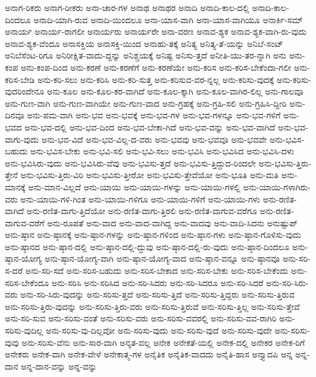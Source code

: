 {ಅನಾಗ-ರಿಕರು
ಅನಾಗ-ರೀಕರು
ಅನಾ-ಚಾರ-ಗಳ
ಅನಾಥ
ಅನಾಥರ
ಅನಾದಿ
ಅನಾದಿ-ಕಾಲ-ದಲ್ಲಿ
ಅನಾದಿ-ಕಾಲ-ದಿಂದಲೂ
ಅನಾದಿ-ಯಾಗಿ-ರುವ
ಅನಾದಿ-ಯಿಂದಲೂ
ಅನಾ-ಯಾಸ-ವಾಗಿ
ಅನಾ-ಯಾಸ-ವಾಗಿಯೂ
ಅನಾರ್ಕಿ-ಸಮ್
ಅನಾರ್ಯ
ಅನಾರ್ಯ-ರಾಗಲೀ
ಅನಾರ್ಯರು
ಅನಾರ್ಯರೇ
ಅನಾ-ವರಣ
ಅನಾವ-ಶ್ಯಕ
ಅನಾವ-ಶ್ಯಕ-ವಾಗಿ-ರು-ವುದು
ಅನಾವ-ಶ್ಯಕ-ವೆಂದೂ
ಅನಾಸಕ್ತಿಯ
ಅನಾಸಕ್ತಿ-ಯಿಂದ
ಅನಾಹು-ತಕ್ಕೆ
ಅನಿತ್ಯ
ಅನಿತ್ಯ-ತೆ-ಯನ್ನು
ಅನಿಬೆ-ಸಂಟ್
ಅನಿಬೆಸೆಂಟ-ರಿಗೂ
ಅನಿರೀಕ್ಷಿತ-ವಾದು-ದ್ದನ್ನು
ಅನಿಶ್ಚಯಕ್ಕೆ
ಅನಿಷ್ಟ
ಅನಿಸು-ತ್ತದೆ
ಅನೀತಿ-ಯು-ತರ-ನ್ನಾಗಿ
ಅನು
ಅನು-ಕಂಪ
ಅನು-ಕಂಪ-ದಿಂದ
ಅನು-ಕರಣೆ
ಅನು-ಕರಣೆಗೆ
ಅನು-ಕರಣೆಯೇ
ಅನು-ಕರಿಸ
ಅನು-ಕರಿಸ-ಬೇಕೆಂದಾ-ಗಲೀ
ಅನು-ಕರಿಸ-ಬೇಡಿ
ಅನು-ಕರಿ-ಸಲು
ಅನು-ಕರಿಸಿ
ಅನು-ಕರಿ-ಸುತ್ತ
ಅನು-ಕರಿಸುವ-ವರ-ನ್ನಲ್ಲ
ಅನು-ಕರಿಸು-ವುದಕ್ಕೆ
ಅನು-ಕರಿಸು-ವುದರಿಂದೇನೂ
ಅನು-ಕೂಲ
ಅನು-ಕೂಲ-ಕರ-ವಾಗಿದೆ
ಅನು-ಕೂಲ-ಕ್ಕಾಗಿ
ಅನು-ಕೂಲ-ವಾಗಿರ-ಲಿಲ್ಲ
ಅನು-ಗಾಲವೂ
ಅನು-ಗುಣ-ವಾಗಿ
ಅನು-ಗುಣ-ವಾಗಿಯೇ
ಅನು-ಗುಣ-ವಾದ
ಅನು-ಗ್ರಹಕ್ಕೆ
ಅನು-ಗ್ರಹಿ-ಸಲಿ
ಅನು-ಗ್ರಹಿಸಿ-ದ್ದೀರಿ
ಅನು-ದಿನವೂ
ಅನು-ಪಮ-ವಾಗಿ
ಅನು-ಭವ
ಅನು-ಭವಕ್ಕೆ
ಅನು-ಭವ-ಗಳ
ಅನು-ಭವ-ಗಳನ್ನೂ
ಅನು-ಭವ-ಗಳಿಗೆ
ಅನು-ಭವದ
ಅನು-ಭವ-ದಲ್ಲಿ
ಅನು-ಭವ-ದಿಂದ
ಅನು-ಭವ-ಬೇಕಾ-ಗಿದೆ
ಅನು-ಭವ-ವನ್ನು
ಅನು-ಭವ-ವಾಗಿದೆ
ಅನು-ಭವ-ವಾಗು-ವುದು
ಅನು-ಭವ-ವಿದೆ
ಅನು-ಭವ-ವಿಲ್ಲ-ದ-ವರು
ಅನು-ಭವವು
ಅನು-ಭವವೂ
ಅನು-ಭವವೇ
ಅನು-ಭವಿಸ-ಬಹುದು
ಅನು-ಭವಿಸ-ಬೇಕು
ಅನು-ಭವಿ-ಸಲಿ
ಅನು-ಭವಿ-ಸಲು
ಅನು-ಭವಿಸಿ
ಅನು-ಭವಿಸಿದ
ಅನು-ಭವಿಸಿ-ದಳು
ಅನು-ಭವಿಸಿರು-ವುದು
ಅನು-ಭವಿಸಿರು-ವೆವು
ಅನು-ಭವಿಸು-ತ್ತದೆ
ಅನು-ಭವಿಸು-ತ್ತಿದ್ದುದ-ರಿಂದಲೇ
ಅನು-ಭವಿಸು-ತ್ತಿರು-ತ್ತೇನೆ
ಅನು-ಭವಿಸು-ತ್ತಿರು-ವಿರಿ
ಅನು-ಭವಿಸು-ತ್ತೀರೋ
ಅನು-ಭವಿಸು-ತ್ತೇವೆಯೋ
ಅನು-ಭೂತಿ
ಅನು-ಮತಿ
ಅನು-ಮಾನಕ್ಕೆ
ಅನು-ಮಾನ-ವಿಲ್ಲದೆ
ಅನು-ಯಾಯಿ
ಅನು-ಯಾಯಿ-ಗಳನ್ನು
ಅನು-ಯಾಯಿ-ಗಳಲ್ಲಿ
ಅನು-ಯಾಯಿ-ಗಳಾಗಿರು-ವರು
ಅನು-ಯಾಯಿ-ಗಳಿ-ಗಿಂತ
ಅನು-ಯಾಯಿ-ಗಳಿಗೂ
ಅನು-ಯಾಯಿ-ಗಳಿಗೆ
ಅನು-ಯಾಯಿ-ಗಳು
ಅನು-ರಣಿತ-ವಾಗಿದೆ
ಅನು-ರಣಿತ-ವಾಗು-ತ್ತಿದೆಯೋ
ಅನು-ರಣಿತ-ವಾಗು-ತ್ತಿರಲಿ
ಅನು-ರಣಿತ-ವಾಗುವ-ವರೆಗೂ
ಅನು-ರಣಿತ-ವಾಗುವ-ವರೆಗೆ
ಅನು-ರೂಪತೆ
ಅನು-ವಾದ
ಅನು-ವಾದ-ವಾಗಿದ್ದ
ಅನು-ವಾದವು
ಅನು-ವಾದಿ-ಸಿದನು
ಅನುಷ್ಟುಪ್
ಅನು-ಷ್ಠಾನ
ಅನು-ಷ್ಠಾನಕ್ಕೆ
ಅನು-ಷ್ಠಾನ-ಗಳನ್ನು
ಅನು-ಷ್ಠಾನ-ಗಳಿಂದ
ಅನು-ಷ್ಠಾನ-ಗಳು
ಅನು-ಷ್ಠಾನ-ಗೊಳಿಸು-ವುದು
ಅನು-ಷ್ಠಾನದ
ಅನು-ಷ್ಠಾನ-ದಲ್ಲಿ
ಅನು-ಷ್ಠಾನ-ದಲ್ಲಿ-ದ್ದುವು
ಅನು-ಷ್ಠಾನ-ದಲ್ಲಿ-ರು-ವುದು
ಅನು-ಷ್ಠಾನ-ದಿಂದಲೂ
ಅನು-ಷ್ಠಾನ-ಯೋಗ್ಯ
ಅನು-ಷ್ಠಾನ-ಯೋಗ್ಯ-ವಾಗಿ
ಅನು-ಷ್ಠಾನ-ಯೋಗ್ಯ-ವಾದ
ಅನು-ಷ್ಠಾನ-ವನ್ನೂ
ಅನು-ಷ್ಠಾನವೂ
ಅನು-ಸರಿ-ಸ-ದರೆ
ಅನು-ಸರಿ-ಸದೆ
ಅನು-ಸರಿಸ-ಬಹುದು
ಅನು-ಸರಿಸ-ಬೇಕಾದ
ಅನು-ಸರಿಸ-ಬೇಕು
ಅನು-ಸರಿಸ-ಬೇಕೆಂದು
ಅನು-ಸರಿಸ-ಬೇಕೆಂದೂ
ಅನು-ಸರಿಸಿ
ಅನು-ಸರಿಸಿದ
ಅನು-ಸರಿ-ಸಿದರು
ಅನು-ಸರಿ-ಸಿದರೂ
ಅನು-ಸರಿ-ಸಿದರೆ
ಅನು-ಸರಿ-ಸಿರು-ವರು
ಅನು-ಸರಿ-ಸಿರು-ವುದನ್ನು
ಅನು-ಸರಿಸು-ತ್ತದೆ
ಅನು-ಸರಿಸು-ತ್ತಿದೆ
ಅನು-ಸರಿಸು-ತ್ತಿದ್ದರು
ಅನು-ಸರಿಸು-ತ್ತಿರುವ
ಅನು-ಸರಿಸು-ತ್ತಿರು-ವುದನ್ನು
ಅನು-ಸರಿಸು-ತ್ತಿರು-ವರು
ಅನು-ಸರಿಸು-ತ್ತಿರುವೆ
ಅನು-ಸರಿಸು-ತ್ತಿಲ್ಲ
ಅನು-ಸರಿಸು-ತ್ತೇವೆ
ಅನು-ಸರಿ-ಸುವ
ಅನು-ಸರಿಸು-ವಂತೆ
ಅನು-ಸರಿಸು-ವರು
ಅನು-ಸರಿಸು-ವವರಲ್ಲಿ
ಅನು-ಸರಿಸು-ವವ-ರಾಗಿರಿ
ಅನು-ಸರಿಸು-ವುದಿಲ್ಲ
ಅನು-ಸರಿಸು-ವು-ದಿಲ್ಲವೋ
ಅನು-ಸರಿಸು-ವುದು
ಅನು-ಸರಿಸು-ವುದೆ
ಅನು-ಸರಿಸು-ವುದೇ
ಅನು-ಸರಿಸು-ವುವು
ಅನು-ಸರಿಸು-ವೆನು
ಅನು-ಸಾರ-ವಾಗಿ
ಅನೃತ-ವಲ್ಲ
ಅನೇಕ
ಅನೇಕತೆ-ಯಲ್ಲಿ
ಅನೇಕ-ದಲ್ಲಿ
ಅನೇಕರ
ಅನೇಕ-ರಿಗೆ
ಅನೇಕರು
ಅನೇಕ-ವಾಗಿ
ಅನೇಕ-ವೇಳೆ
ಅನೇಕಾತ್ಮ-ಗಳ
ಅನೈತಿಕ
ಅನೈತಿಕ-ವಾದದು
ಅನೈತಿ-ಹಾಸ
ಅನ್ತ್ಯಾದಪಿ
ಅನ್ನ
ಅನ್ನ-ದಾನ
ಅನ್ನ-ದಾನ-ವನ್ನು
ಅನ್ನ-ವನ್ನು
}
